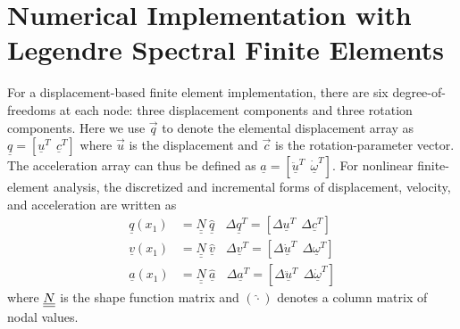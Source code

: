 \section{Numerical Implementation with Legendre Spectral Finite Elements}
\label{sec:NumImp}
For a displacement-based finite element implementation, there are six degree-of-freedoms at each node: three displacement components and three rotation components. 
Here we use $\vec{q}$ to denote the elemental displacement array as $\underline{q}=\left[
\underline{u}^T~~\underline{c}^T\right]$ where $\vec{u}$ is the displacement and $\vec{c}$ is the rotation-parameter vector. 
The acceleration array can thus be defined as $\underline{a}=\left[ \ddot{\underline{u}}^T~~ \dot{\underline{\omega}}^T \right]$. 
For nonlinear finite-element analysis, the discretized and incremental forms of displacement, velocity, and acceleration are written as
\begin{align}
	\label{Discretized}
	\underline{q} (x_1) &= \underline{\underline{N}} ~\hat{\underline{q}}~~~~\Delta \underline{q}^T = \left[ \Delta \underline{u}^T~~\Delta \underline{c}^T \right] \\
	\underline{v}(x_1) &= \underline{\underline{N}}~\hat{\underline{v}}~~~~\Delta \underline{v}^T = \left[\Delta \underline{\dot{u}}^T~~\Delta \underline{\omega}^T \right] \\
	\underline{a}(x_1) &= \underline{\underline{N}}~ \hat{\underline{a}}~~~~\Delta \underline{a}^T = \left[ \Delta \ddot{\underline{u}}^T~~\Delta \dot{\underline{\omega}}^T \right]	
\end{align}
where $\underline{\underline{N}}$ is the shape function matrix and $(\hat{\cdot})$ denotes a column matrix of nodal values. 


